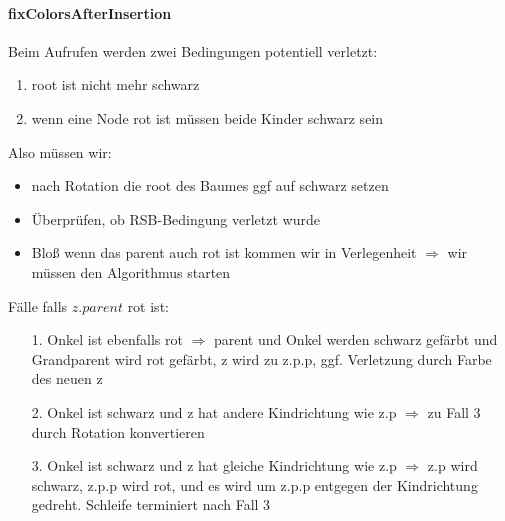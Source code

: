 \documentclass[
    ngerman,
    color=3b,
    dark_mode,
    summary,
    boxarc,
]{rubos-tuda-template}
\begin{document}
\paragraph{fixColorsAfterInsertion}
Beim Aufrufen werden zwei Bedingungen potentiell verletzt:
\begin{enumerate}
    \item root ist nicht mehr schwarz
    \item wenn eine Node rot ist müssen beide Kinder schwarz sein
\end{enumerate}
Also müssen wir:
\begin{itemize}
    \item nach Rotation die root des Baumes ggf auf schwarz setzen
    \item Überprüfen, ob RSB-Bedingung verletzt wurde
    \item Blo\ss{} wenn das parent auch rot ist kommen wir in Verlegenheit $\Longrightarrow$ wir müssen den Algorithmus starten
\end{itemize}

Fälle falls $z.parent$ rot ist:\\
\begin{minipage}{.5\textwidth-1pt}
    \begin{itemize}
        \item[1.] Onkel ist ebenfalls rot $\Rightarrow$ parent und Onkel werden schwarz gefärbt und Grandparent wird rot gefärbt, z wird zu z.p.p, ggf. Verletzung durch Farbe des neuen z
        \item[2.] Onkel ist schwarz und z hat andere Kindrichtung wie z.p $\Rightarrow$ zu Fall 3 durch Rotation konvertieren
        \item[3.] Onkel ist schwarz und z hat gleiche Kindrichtung wie z.p $\Rightarrow$ z.p wird schwarz, z.p.p wird rot, und es wird um z.p.p entgegen der Kindrichtung gedreht. Schleife terminiert nach Fall 3
    \end{itemize}
\end{minipage}\hspace{2pt}%
\begin{minipage}{.5\textwidth-1pt}
    \begin{tcolorbox}[
            colback=yellow!20,
            colframe=black!70,
            enhanced,
            title={Fall 1},
            fonttitle=\sffamily\bfseries,
            center title,
            every float=\centering
        ]
        \centering
        
    \end{tcolorbox}
\end{minipage}
\end{document}
